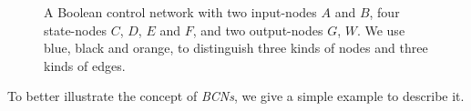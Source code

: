  
 \begin{figure}[thpb]
      \centering
      
      \caption{A Boolean control network with two input-nodes $A$ and $B$, four state-nodes $C$, $D$, $E$ and $F$, and two output-nodes $G$, $W$. We use blue, black and orange, to distinguish three kinds of nodes and three kinds of edges.}
      \label{fig:1}
  \end{figure}

To better illustrate the concept of {\em BCNs}, we give a simple example to describe it.


